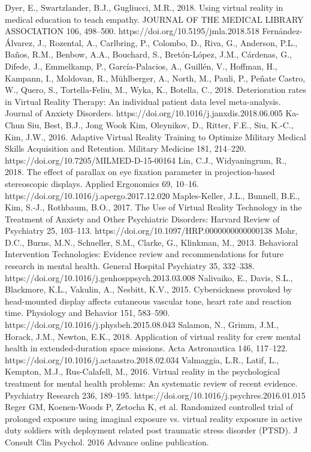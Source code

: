 \documentclass[10pt,journal,compsoc]{IEEEtran}
\begin{document}
	\begin{thebibliography}{1}
		
	\bibitem
Dyer, E., Swartzlander, B.J., Gugliucci, M.R., 2018. Using virtual reality in medical education to teach empathy. JOURNAL OF THE MEDICAL LIBRARY ASSOCIATION 106, 498–500. https://doi.org/10.5195/jmla.2018.518
\bibitem
Fernández-Álvarez, J., Rozental, A., Carlbring, P., Colombo, D., Riva, G., Anderson, P.L., Baños, R.M., Benbow, A.A., Bouchard, S., Bretón-López, J.M., Cárdenas, G., Difede, J., Emmelkamp, P., García-Palacios, A., Guillén, V., Hoffman, H., Kampann, I., Moldovan, R., Mühlberger, A., North, M., Pauli, P., Peñate Castro, W., Quero, S., Tortella-Feliu, M., Wyka, K., Botella, C., 2018. Deterioration rates in Virtual Reality Therapy: An individual patient data level meta-analysis. Journal of Anxiety Disorders. https://doi.org/10.1016/j.janxdis.2018.06.005
\bibitem
Ka-Chun Siu, Best, B.J., Jong Wook Kim, Oleynikov, D., Ritter, F.E., Siu, K.-C., Kim, J.W., 2016. Adaptive Virtual Reality Training to Optimize Military Medical Skills Acquisition and Retention. Military Medicine 181, 214–220. https://doi.org/10.7205/MILMED-D-15-00164
\bibitem
Lin, C.J., Widyaningrum, R., 2018. The effect of parallax on eye fixation parameter in projection-based stereoscopic displays. Applied Ergonomics 69, 10–16. https://doi.org/10.1016/j.apergo.2017.12.020
\bibitem
Maples-Keller, J.L., Bunnell, B.E., Kim, S.-J., Rothbaum, B.O., 2017. The Use of Virtual Reality Technology in the Treatment of Anxiety and Other Psychiatric Disorders: Harvard Review of Psychiatry 25, 103–113. https://doi.org/10.1097/HRP.0000000000000138
\bibitem
Mohr, D.C., Burns, M.N., Schueller, S.M., Clarke, G., Klinkman, M., 2013. Behavioral Intervention Technologies: Evidence review and recommendations for future research in mental health. General Hospital Psychiatry 35, 332–338. https://doi.org/10.1016/j.genhosppsych.2013.03.008
\bibitem
Nalivaiko, E., Davis, S.L., Blackmore, K.L., Vakulin, A., Nesbitt, K.V., 2015. Cybersickness provoked by head-mounted display affects cutaneous vascular tone, heart rate and reaction time. Physiology and Behavior 151, 583–590. https://doi.org/10.1016/j.physbeh.2015.08.043
\bibitem
Salamon, N., Grimm, J.M., Horack, J.M., Newton, E.K., 2018. Application of virtual reality for crew mental health in extended-duration space missions. Acta Astronautica 146, 117–122. https://doi.org/10.1016/j.actaastro.2018.02.034
\bibitem
Valmaggia, L.R., Latif, L., Kempton, M.J., Rus-Calafell, M., 2016. Virtual reality in the psychological treatment for mental health problems: An systematic review of recent evidence. Psychiatry Research 236, 189–195. https://doi.org/10.1016/j.psychres.2016.01.015
\bibitem
Reger GM, Koenen-Woods P, Zetocha K, et al. Randomized controlled trial of prolonged exposure using imaginal exposure vs. virtual reality exposure in active duty soldiers with deployment related post traumatic stress disorder (PTSD). J Consult Clin Psychol. 2016 Advance online publication. 

	\end{thebibliography}
	
\end{document}
